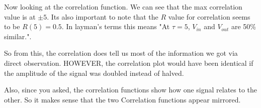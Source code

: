 \documentclass{article}
\begin{document}
Now looking at the correlation function. We can see that the max correlation value is at $\pm 5$. Its also important to note that the $R$ value for correlation seems to be $R(5) = 0.5$. In layman's terms this means "At $\tau = 5$, $V_{in}$ and $V_{out}$ are 50\% similar.".

So from this, the correlation does tell us most of the information we got via direct observation. HOWEVER, the correlation plot would have been identical if the amplitude of the signal was doubled instead of halved.

Also, since you asked, the correlation functions show how one signal relates to the other. So it makes sense that the two Correlation functions appear mirrored.
\end{document}
